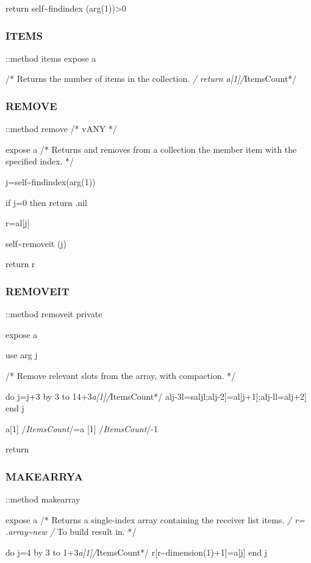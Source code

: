 return self\textasciitilde findindex (arg(1))\textgreater0

\subsubsection{ITEMS}\label{items}

::method items expose a

/* Returns the number of items in the collection. \emph{/ return
a{[}1{]}/}ItemsCount*/

\subsubsection{REMOVE}\label{remove}

::method remove /* vANY */

expose a /* Returns and removes from a collection the member item with
the specified index. */

j=self\textasciitilde findindex(arg(1))

if j=0 then return .nil

r=al{[}j{]}

self\textasciitilde removeit (j)

return r

\subsubsection{REMOVEIT}\label{removeit}

::method removeit private

expose a

use arg j

/* Remove relevant slots from the array, with compaction. */

do j=j+3 by 3 to 14+3\emph{a{[}1{]}/}ItemsCount*/
alj-3l=saljl;alj-2{]}=al{[}j+1{]};alj-ll=alj+2{]} end j

a{[}1{]} /\emph{ItemsCount}/=a {[}1{]} /\emph{ItemsCount}/-1

return

\subsubsection{MAKEARRYA}\label{makearrya}

::method makearray

expose a /* Returns a single-index array containing the receiver list
items. \emph{/ r= .array\textasciitilde new /} To build result in. */

do j=4 by 3 to 1+3\emph{a{[}1{]}/}ItemsCount*/
r{[}r\textasciitilde dimension(1)+1{]}=a{[}j{]} end j

